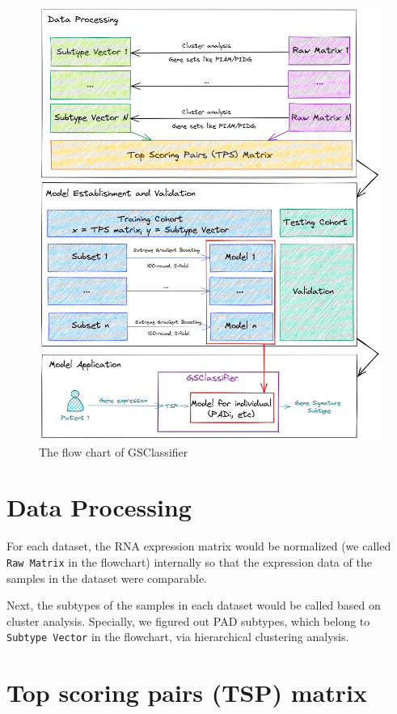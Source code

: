 \documentclass[
]{book}
\begin{document}
\begin{figure}

{\centering \includegraphics[width=0.9\linewidth]{./fig/flowchart} 

}

\caption{The flow chart of GSClassifier}\label{fig:flowchart}
\end{figure}

\hypertarget{data-processing}{%
\section{Data Processing}\label{data-processing}}

For each dataset, the RNA expression matrix would be normalized (we called \texttt{Raw\ Matrix} in the flowchart) internally so that the expression data of the samples in the dataset were comparable.

Next, the subtypes of the samples in each dataset would be called based on cluster analysis. Specially, we figured out PAD subtypes, which belong to \texttt{Subtype\ Vector} in the flowchart, via hierarchical clustering analysis.

\hypertarget{top-scoring-pairs-tsp-matrix}{%
\section{Top scoring pairs (TSP) matrix}\label{top-scoring-pairs-tsp-matrix}}
\end{document}
